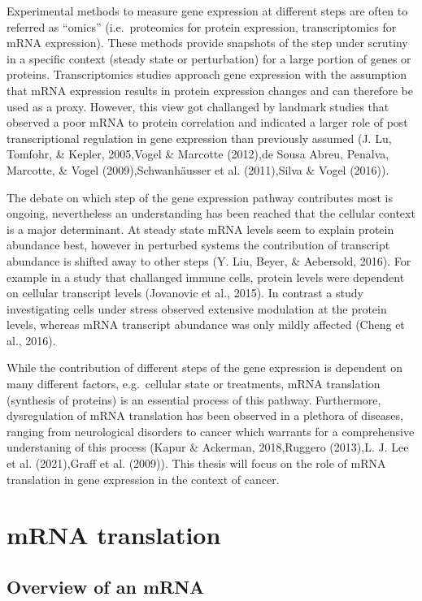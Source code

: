 \documentclass[12pt,openany]{book}
\begin{document}
Experimental methods to measure gene expression at different steps are
often to referred as ``omics'' (i.e.~proteomics for protein expression,
transcriptomics for mRNA expression). These methods provide snapshots of
the step under scrutiny in a specific context (steady state or
perturbation) for a large portion of genes or proteins. Transcriptomics
studies approach gene expression with the assumption that mRNA
expression results in protein expression changes and can therefore be
used as a proxy. However, this view got challanged by landmark studies
that observed a poor mRNA to protein correlation and indicated a larger
role of post transcriptional regulation in gene expression than
previously assumed (J. Lu, Tomfohr, \& Kepler, 2005,Vogel \& Marcotte
(2012),de Sousa Abreu, Penalva, Marcotte, \& Vogel (2009),Schwanhäusser
et al. (2011),Silva \& Vogel (2016)).

The debate on which step of the gene expression pathway contributes most
is ongoing, nevertheless an understanding has been reached that the
cellular context is a major determinant. At steady state mRNA levels
seem to explain protein abundance best, however in perturbed systems the
contribution of transcript abundance is shifted away to other steps (Y.
Liu, Beyer, \& Aebersold, 2016). For example in a study that challanged
immune cells, protein levels were dependent on cellular transcript
levels (Jovanovic et al., 2015). In contrast a study investigating cells
under stress observed extensive modulation at the protein levels,
whereas mRNA transcript abundance was only mildly affected (Cheng et
al., 2016).

While the contribution of different steps of the gene expression is
dependent on many different factors, e.g.~cellular state or treatments,
mRNA translation (synthesis of proteins) is an essential process of this
pathway. Furthermore, dysregulation of mRNA translation has been
observed in a plethora of diseases, ranging from neurological disorders
to cancer which warrants for a comprehensive understaning of this
process (Kapur \& Ackerman, 2018,Ruggero (2013),L. J. Lee et al.
(2021),Graff et al. (2009)). This thesis will focus on the role of mRNA
translation in gene expression in the context of cancer. \clearpage

\section{mRNA translation}\subsection{Overview of an mRNA}
\end{document}
